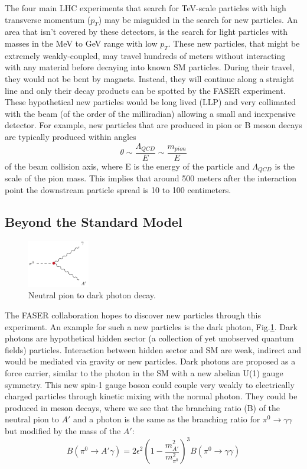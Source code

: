 The four main LHC experiments that search for TeV-scale particles with high transverse momentum ($p_{T}$) may be misguided in the search for new particles. An area that isn't covered by these detectors, is the search for light particles with masses in the MeV to GeV range with low $p_{T}$. These new particles, that might be extremely weakly-coupled, may travel hundreds of meters without interacting with any material before decaying into known SM particles. During their travel, they would not be bent by magnets. Instead, they will continue along a straight line and only their decay products can be spotted by the FASER experiment. These hypothetical new particles would be long lived (LLP) and very collimated with the beam (of the order of the milliradian) allowing a small and inexpensive detector. For example, new particles that are produced in pion or B meson decays are typically produced within angles \[ \theta\sim\frac{\Lambda_{QCD}}{E}\sim\frac{m_{pion}}{E} \] of the beam collision axis, where E is the energy of the particle and $\Lambda_{QCD}$ is the scale of the pion mass. This implies that around 500 meters after the interaction point the downstream particle spread is 10 to 100 centimeters. \cite{faser_collaboration_letter_2018}

\newpage
\subsection{Beyond the Standard Model}

\begin{figure}
  \centering
    \includegraphics[width=0.24\textwidth]{DarkPhoton.png} 
    \caption[Neutral Pion Decay]{Neutral pion to dark photon decay.}
    \label{fig:Dark Photon}
\end{figure}

The FASER collaboration hopes to discover new particles through this experiment. An example for such a new particles is the dark photon, Fig.\ref{fig:Dark Photon}. Dark photons are hypothetical hidden sector (a collection of yet unobserved quantum fields) particles. Interaction between hidden sector and SM are weak, indirect and would be mediated via gravity or new particles. Dark photons are proposed as a force carrier, similar to the photon in the SM with a new abelian U(1) gauge symmetry. This new spin-1 gauge boson could couple very weakly to electrically charged particles through kinetic mixing with the normal photon. \cite{noauthor_dark_2019}
They could be produced in meson decays, where we see that the branching ratio (B) of the neutral pion to $A'$ and a photon is the same as the branching ratio for $\pi^0 \rightarrow \gamma\gamma$ but modified by the mass of  the $A'$:
\[
B(\pi^0 \rightarrow A'\gamma)=2\epsilon^2\left( 1-\frac{m^2_{A'}}{m^2_{\pi^0}} \right)^3B(\pi^0 \rightarrow \gamma\gamma)
\]

